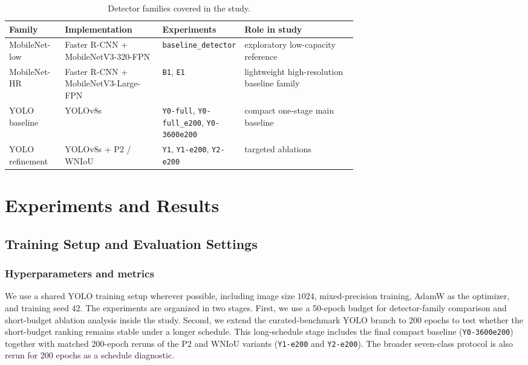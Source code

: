 \documentclass[10pt,a4paper]{article}
\begin{document}
\begin{table}[t]
  \centering
  \caption{Detector families covered in the study.}
  \label{tab:detector-families}
  \footnotesize
  \setlength{\tabcolsep}{4pt}
  \begin{tabularx}{\linewidth}{>{\raggedright\arraybackslash}p{0.16\linewidth} >{\raggedright\arraybackslash}p{0.28\linewidth} >{\raggedright\arraybackslash}p{0.23\linewidth} X}
    \toprule
    Family & Implementation & Experiments & Role in study \\
    \midrule
    MobileNet-low & Faster R-CNN + MobileNetV3-320-FPN & \texttt{baseline\_detector} & exploratory low-capacity reference \\
    MobileNet-HR & Faster R-CNN + MobileNetV3-Large-FPN & \texttt{B1}, \texttt{E1} & lightweight high-resolution baseline family \\
    YOLO baseline & YOLOv8s & \texttt{Y0-full}, \texttt{Y0-full\_e200}, \texttt{Y0-3600e200} & compact one-stage main baseline \\
    YOLO refinement & YOLOv8s + P2 / WNIoU & \texttt{Y1}, \texttt{Y1-e200}, \texttt{Y2-e200} & targeted ablations \\
    \bottomrule
  \end{tabularx}
\end{table}



\section{Experiments and Results}
\label{sec:experiments}

\subsection{Training Setup and Evaluation Settings}
\label{sec:training}

\subsubsection{Hyperparameters and metrics}
We use a shared YOLO training setup wherever possible, including image size $1024$, mixed-precision training, AdamW as the optimizer, and training seed 42. The experiments are organized in two stages. First, we use a 50-epoch budget for detector-family comparison and short-budget ablation analysis inside the study. Second, we extend the curated-benchmark YOLO branch to 200 epochs to test whether the short-budget ranking remains stable under a longer schedule. This long-schedule stage includes the final compact baseline (\texttt{Y0-3600e200}) together with matched 200-epoch reruns of the P2 and WNIoU variants (\texttt{Y1-e200} and \texttt{Y2-e200}). The broader seven-class protocol is also rerun for 200 epochs as a schedule diagnostic.
\end{document}
